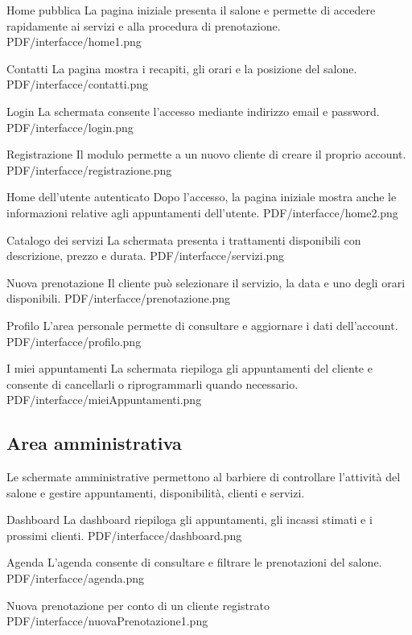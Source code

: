 \documentclass[12pt,a4paper]{article}
\begin{document}
\schermata
    {Home pubblica}
    {La pagina iniziale presenta il salone e permette di accedere rapidamente
    ai servizi e alla procedura di prenotazione.}
    {PDF/interfacce/home1.png}

\schermata
    {Contatti}
    {La pagina mostra i recapiti, gli orari e la posizione del salone.}
    {PDF/interfacce/contatti.png}

\schermata
    {Login}
    {La schermata consente l'accesso mediante indirizzo email e password.}
    {PDF/interfacce/login.png}

\schermata
    {Registrazione}
    {Il modulo permette a un nuovo cliente di creare il proprio account.}
    {PDF/interfacce/registrazione.png}

\schermata
    {Home dell'utente autenticato}
    {Dopo l'accesso, la pagina iniziale mostra anche le informazioni relative
    agli appuntamenti dell'utente.}
    {PDF/interfacce/home2.png}

\schermata
    {Catalogo dei servizi}
    {La schermata presenta i trattamenti disponibili con descrizione, prezzo
    e durata.}
    {PDF/interfacce/servizi.png}

\schermata
    {Nuova prenotazione}
    {Il cliente può selezionare il servizio, la data e uno degli orari
    disponibili.}
    {PDF/interfacce/prenotazione.png}

\schermata
    {Profilo}
    {L'area personale permette di consultare e aggiornare i dati
    dell'account.}
    {PDF/interfacce/profilo.png}

\schermata
    {I miei appuntamenti}
    {La schermata riepiloga gli appuntamenti del cliente e consente di
    cancellarli o riprogrammarli quando necessario.}
    {PDF/interfacce/mieiAppuntamenti.png}

\subsection{Area amministrativa}
Le schermate amministrative permettono al barbiere di controllare l'attività
del salone e gestire appuntamenti, disponibilità, clienti e servizi.

\schermata
    {Dashboard}
    {La dashboard riepiloga gli appuntamenti, gli incassi stimati e i prossimi
    clienti.}
    {PDF/interfacce/dashboard.png}

\schermata
    {Agenda}
    {L'agenda consente di consultare e filtrare le prenotazioni del salone.}
    {PDF/interfacce/agenda.png}

\schermata
    {Nuova prenotazione per conto di un cliente registrato}
    {}
    {PDF/interfacce/nuovaPrenotazione1.png}
\end{document}
